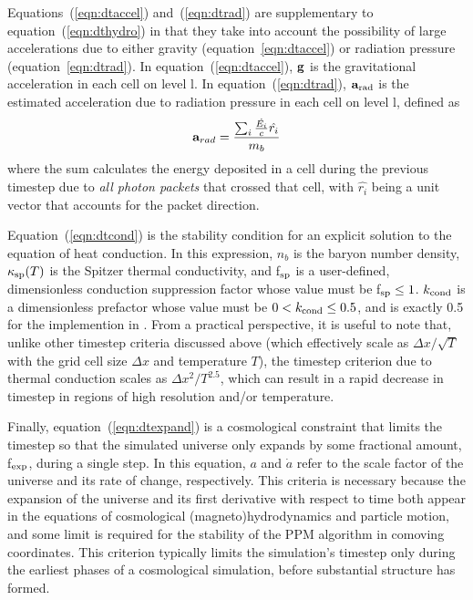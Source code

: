 Equations~(\ref{eqn:dtaccel}) and~(\ref{eqn:dtrad}) are supplementary to equation~(\ref{eqn:dthydro}) in that they
take into account the possibility of large accelerations due to either
gravity (equation~\ref{eqn:dtaccel}) or radiation pressure
(equation~\ref{eqn:dtrad}).  In equation~(\ref{eqn:dtaccel}), $\mathbf{g}$ is the
gravitational acceleration in each cell on level l.  In
equation~(\ref{eqn:dtrad}), $\mathbf{a}_{\rm rad}$ is the estimated
acceleration due to radiation pressure in each cell on level l,
defined as
\begin{equation}
\myvec{a}_{rad} = \frac{ \sum_i \frac{\dot{E_i}}{c} \hat{r_i} }{m_b} 
\end{equation}
where the sum calculates the energy deposited in a cell during the
previous timestep due to \textit{all photon packets} that crossed that
cell, with $\hat{r_i}$ being a unit vector that accounts for the
packet direction.

Equation~(\ref{eqn:dtcond}) is the stability condition for an explicit
solution to the equation of heat conduction.  In this expression,
$n_b$ is the baryon number density, 
$\kappa_{\rm sp}(T)$ is the Spitzer thermal conductivity, and f$_{\rm sp}$ is a
user-defined, dimensionless
conduction suppression factor whose value must be f$_{\rm sp} \leq 1$.  
$k_{\rm cond}$ is a dimensionless prefactor whose
value must be $0 < k_{\rm cond}  \leq 0.5$, and is exactly 0.5 for the
implemention in \enzo.
From a practical
perspective, it is useful to note that, unlike other timestep criteria
discussed above (which effectively scale as $\Delta x / \sqrt{T}$ with
the grid cell size $\Delta x$ and temperature $T$),
the timestep criterion due to thermal conduction scales as $\Delta x^2
/ T^{2.5}$, which can result in a rapid decrease in timestep in
regions of high resolution and/or temperature.

Finally, equation~(\ref{eqn:dtexpand}) is a cosmological constraint that
limits the timestep so that the simulated universe only expands by
some fractional amount, f$_{\rm exp}$, during a single step.  In this
equation, $a$ and $\dot{a}$ refer to the scale factor of the universe
and its rate of change, respectively.  This criteria is necessary
because the expansion of the universe and its first derivative with
respect to time both appear in the equations of cosmological
(magneto)hydrodynamics and particle motion, and some limit is required
for the stability of the PPM algorithm in comoving coordinates.  This
criterion typically limits the simulation's timestep
only during the earliest phases of a cosmological simulation, before
substantial structure has formed.
